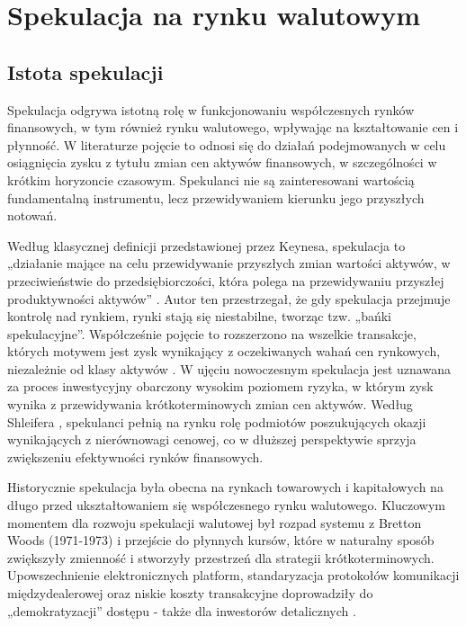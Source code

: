 \chapter{Spekulacja na rynku walutowym}

\section{Istota spekulacji}

Spekulacja odgrywa istotną rolę w funkcjonowaniu współczesnych rynków finansowych, w tym również rynku walutowego, wpływając na kształtowanie cen i płynność. W literaturze pojęcie to odnosi się do działań podejmowanych w celu osiągnięcia zysku z tytułu zmian cen aktywów finansowych, w szczególności w krótkim horyzoncie czasowym. Spekulanci nie są zainteresowani wartością fundamentalną instrumentu, lecz przewidywaniem kierunku jego przyszłych notowań.

Według klasycznej definicji przedstawionej przez Keynesa, spekulacja to „działanie mające na celu przewidywanie przyszłych zmian wartości aktywów, w przeciwieństwie do przedsiębiorczości, która polega na przewidywaniu przyszłej produktywności aktywów” \parencite{keynes1936}. Autor ten przestrzegał, że gdy spekulacja przejmuje kontrolę nad rynkiem, rynki stają się niestabilne, tworząc tzw. „bańki spekulacyjne”. Współcześnie pojęcie to rozszerzono na wszelkie transakcje, których motywem jest zysk wynikający z oczekiwanych wahań cen rynkowych, niezależnie od klasy aktywów \parencite{hull2018}. W ujęciu nowoczesnym spekulacja jest uznawana za proces inwestycyjny obarczony wysokim poziomem ryzyka, w którym zysk wynika z przewidywania krótkoterminowych zmian cen aktywów. Według Shleifera \parencite{shleifer2000}, spekulanci pełnią na rynku rolę podmiotów poszukujących okazji wynikających z nierównowagi cenowej, co w dłuższej perspektywie sprzyja zwiększeniu efektywności rynków finansowych.


Historycznie spekulacja była obecna na rynkach towarowych i kapitałowych na długo przed ukształtowaniem się współczesnego rynku walutowego. Kluczowym momentem dla rozwoju spekulacji walutowej był rozpad systemu z Bretton Woods (1971-1973) i przejście do płynnych kursów, które w naturalny sposób zwiększyły zmienność i stworzyły przestrzeń dla strategii krótkoterminowych. Upowszechnienie elektronicznych platform, standaryzacja protokołów komunikacji międzydealerowej oraz niskie koszty transakcyjne doprowadziły do „demokratyzacji” dostępu - także dla inwestorów detalicznych \parencite{hull2018}.


